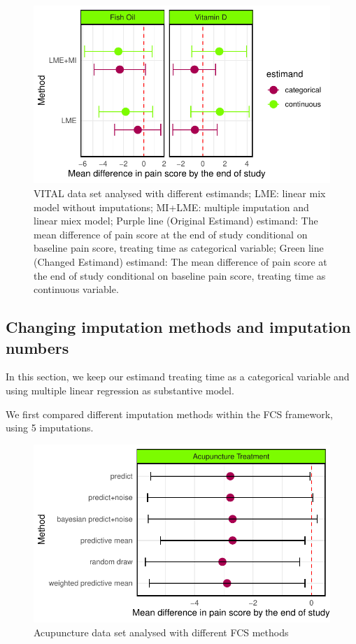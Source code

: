 \documentclass{article}
\newcommand{\pandocbounded}[1]{#1}
\begin{document}
\begin{figure}
\centering
\pandocbounded{\includegraphics[keepaspectratio]{Final_Report_files/figure-latex/unnamed-chunk-28-1.pdf}}
\caption{VITAL data set analysed with different estimands; LME: linear
mix model without imputations; MI+LME: multiple imputation and linear
miex model; Purple line (Original Estimand) estimand: The mean
difference of pain score at the end of study conditional on baseline
pain score, treating time as categorical variable; Green line (Changed
Estimand) estimand: The mean difference of pain score at the end of
study conditional on baseline pain score, treating time as continuous
variable.}
\end{figure}

\subsection{Changing imputation methods and imputation
numbers}\label{changing-imputation-methods-and-imputation-numbers}

In this section, we keep our estimand treating time as a categorical
variable and using multiple linear regression as substantive model.

We first compared different imputation methods within the FCS framework,
using 5 imputations.

\begin{figure}
\centering
\pandocbounded{\includegraphics[keepaspectratio]{Final_Report_files/figure-latex/unnamed-chunk-29-1.pdf}}
\caption{Acupuncture data set analysed with different FCS methods}
\end{figure}
\end{document}
